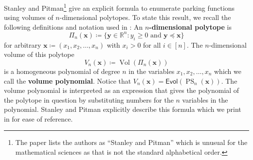 \documentclass{amsart}
\theoremstyle{definition}
\numberwithin{equation}{section}
\newcommand{\Evol}{\textsf{Evol}} %
\newcommand{\PS}{\operatorname{PS}} %
\begin{document}
Stanley and Pitman\footnote{The paper \cite{bib:PitmanStanley} lists the authors as ``Stanley and Pitman'' which is unusual for the mathematical sciences as that is not the standard alphabetical order.}
\cite{bib:PitmanStanley} give an explicit formula to enumerate parking functions using volumes of $n$-dimensional polytopes.
To state this result, we recall the following definitions and notation used in \cite[p.\ 1-2]{bib:PitmanStanley}:
    An \textbf{$n$-dimensional polytope} is
    \[
    \Pi_n(\mathbf{x}) \coloneqq \{ \mathbf{y} \in \mathbb{R}^n : y_i \geq 0 \mbox{ and } \mathbf{y} \preceq \mathbf{x} \}
    \]
    for arbitrary $\mathbf{x} \coloneqq (x_1, x_2, \hdots, x_n)$ with $x_i > 0$ for all $i \in [n]$.
    The $n$-dimensional volume of this polytope
    \[
    V_n(\mathbf{x}) \coloneqq \operatorname{Vol}(\Pi_n(\mathbf{x}))
    \]
    is a homogeneous polynomial of degree $n$ in the variables $x_1, x_2, \hdots, x_n$ which we call the \textbf{volume polynomial}.
Notice that $V_n(\mathbf{x}) = \Evol(\PS_n(\mathbf{x}))$.
The volume polynomial is interpreted as an expression that gives the polynomial of the polytope in question by substituting numbers for the $n$ variables in the polynomial.
Stanley and Pitman \cite{bib:PitmanStanley} explicitly describe this formula which we print in  for ease of reference.
\end{document}
